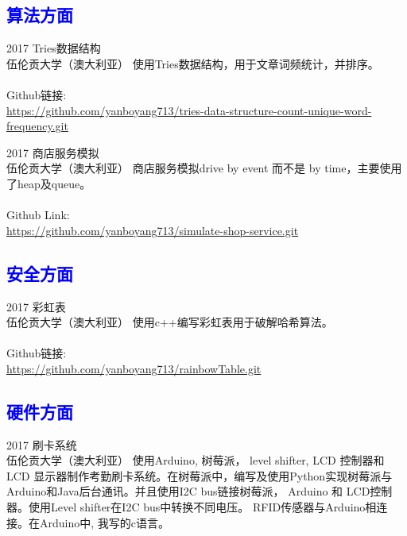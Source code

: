 \documentclass[]{friggeri-cv}
\begin{document}
\subsection{\textcolor{blue}{算法方面}}

\begin{entrylist}
  \entry
    {2017}
    {Tries数据结构\\}
    {伍伦贡大学（澳大利亚）}
    {使用Tries数据结构，用于文章词频统计，并排序。
     \\\\ Github链接: \\{\small\url{https://github.com/yanboyang713/tries-data-structure-count-unique-word-frequency.git}}}
\end{entrylist}

\begin{entrylist}
  \entry
    {2017}
    {商店服务模拟\\}
    {伍伦贡大学（澳大利亚）}
    {商店服务模拟drive by event 而不是 by time，主要使用了heap及queue。
     \\\\ Github Link: \\{\small\url{https://github.com/yanboyang713/simulate-shop-service.git}}}
\end{entrylist}

\subsection*{\textcolor{blue}{安全方面}}

\begin{entrylist}
  \entry
    {2017}
    {彩虹表\\}
    {伍伦贡大学（澳大利亚）}
    {使用c++编写彩虹表用于破解哈希算法。
    \\\\ Github链接: \\{\small\url{https://github.com/yanboyang713/rainbowTable.git}}}
\end{entrylist}

\subsection*{\textcolor{blue}{硬件方面}}

\begin{entrylist}
  \entry
    {2017}
    {刷卡系统\\}
    {伍伦贡大学（澳大利亚）}
    {使用Arduino, 树莓派， level shifter, LCD 控制器和 LCD 显示器制作考勤刷卡系统。在树莓派中，编写及使用Python实现树莓派与Arduino和Java后台通讯。并且使用I2C bus链接树莓派， Arduino 和 LCD控制器。使用Level shifter在I2C bus中转换不同电压。 RFID传感器与Arduino相连接。在Arduino中, 我写的c语言。}
\end{entrylist}
\end{document}
